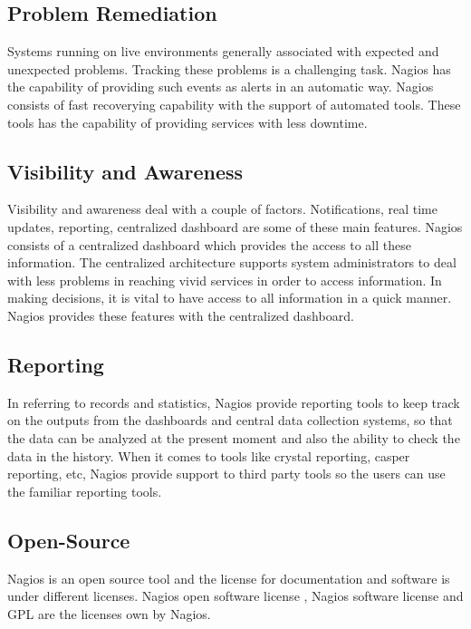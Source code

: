 \documentclass[9pt,twocolumn,twoside]{styles/osajnl}
\begin{document}
\subsection{Problem Remediation}

Systems running on live environments generally associated with
expected and unexpected problems. Tracking these problems is a
challenging task.  Nagios has the capability of providing such events
as alerts in an automatic way.  Nagios consists of fast recoverying
capability with the support of automated tools. These tools has the
capability of providing services with less downtime. 

\subsection{Visibility and Awareness}

Visibility and awareness deal with a couple of factors. Notifications,
real time updates, reporting, centralized dashboard are some of these
main features. Nagios consists of a centralized dashboard which
provides the access to all these information. The centralized
architecture supports system administrators to deal with less problems
in reaching vivid services in order to access information. In making
decisions, it is vital to have access to all information in a quick
manner.  Nagios provides these features with the centralized
dashboard.

\subsection{Reporting}

In referring to records and statistics, Nagios provide reporting tools
to keep track on the outputs from the dashboards and central
data collection systems, so that the data can be analyzed at the
present moment and also the ability to check the data in the history.
When it comes to tools like crystal reporting, casper
reporting, etc, Nagios provide support to third party tools so the
users can use the familiar reporting tools.

\subsection{Open-Source}

Nagios is an open source tool and the license for documentation and software
is under different licenses. Nagios open software license \cite{op-sw-lic-nagios}, Nagios software
license \cite{sw-lic-nagios} and GPL are the licenses own by Nagios. 
\end{document}
